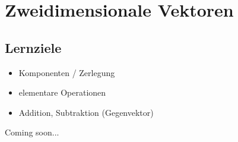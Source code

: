 
\section{Zweidimensionale Vektoren}


\subsection*{Lernziele}
\begin{itemize}
\item Komponenten / Zerlegung
\item elementare Operationen
\item Addition, Subtraktion (Gegenvektor)
\end{itemize}

Coming soon...
